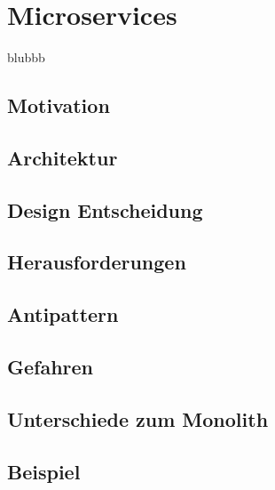 \chapter{Microservices}
blubbb

\section{Motivation}

\section{Architektur}

\section{Design Entscheidung}

\section{Herausforderungen}

\section{Antipattern}

\section{Gefahren}

\section{Unterschiede zum Monolith}

\section{Beispiel}